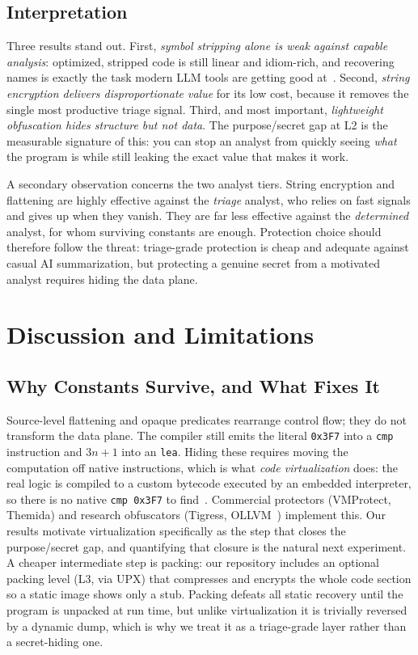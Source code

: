 \documentclass[conference]{IEEEtran}
\begin{document}
\subsection{Interpretation}
Three results stand out. First, \emph{symbol stripping alone is weak against
capable analysis}: optimized, stripped code is still linear and idiom-rich, and
recovering names is exactly the task modern LLM tools are getting good
at~\cite{gennm,funcname,howfar}. Second, \emph{string encryption delivers
disproportionate value} for its low cost, because it removes the single most
productive triage signal. Third, and most important, \emph{lightweight
obfuscation hides structure but not data}. The purpose/secret gap at L2 is the
measurable signature of this: you can stop an analyst from quickly seeing
\emph{what} the program is while still leaking the exact value that makes it
work.

A secondary observation concerns the two analyst tiers. String encryption and
flattening are highly effective against the \emph{triage} analyst, who relies on
fast signals and gives up when they vanish. They are far less effective against
the \emph{determined} analyst, for whom surviving constants are enough. Protection
choice should therefore follow the threat: triage-grade protection is cheap and
adequate against casual AI summarization, but protecting a genuine secret from a
motivated analyst requires hiding the data plane.

\section{Discussion and Limitations}\label{sec:discuss}
\subsection{Why Constants Survive, and What Fixes It}
Source-level flattening and opaque predicates rearrange control flow; they do not
transform the data plane. The compiler still emits the literal \texttt{0x3F7} into
a \texttt{cmp} instruction and $3n+1$ into an \texttt{lea}. Hiding these requires
moving the computation off native instructions, which is what \emph{code
virtualization} does: the real logic is compiled to a custom bytecode executed by
an embedded interpreter, so there is no native \texttt{cmp 0x3F7} to
find~\cite{protecting-survey}. Commercial protectors (VMProtect, Themida) and
research obfuscators (Tigress, OLLVM~\cite{ollvm}) implement this. Our results
motivate virtualization specifically as the step that closes the purpose/secret
gap, and quantifying that closure is the natural next experiment. A cheaper
intermediate step is packing: our repository includes an optional packing level
(L3, via UPX) that compresses and encrypts the whole code section so a static
image shows only a stub. Packing defeats all static recovery until the program is
unpacked at run time, but unlike virtualization it is trivially reversed by a
dynamic dump, which is why we treat it as a triage-grade layer rather than a
secret-hiding one.
\end{document}
